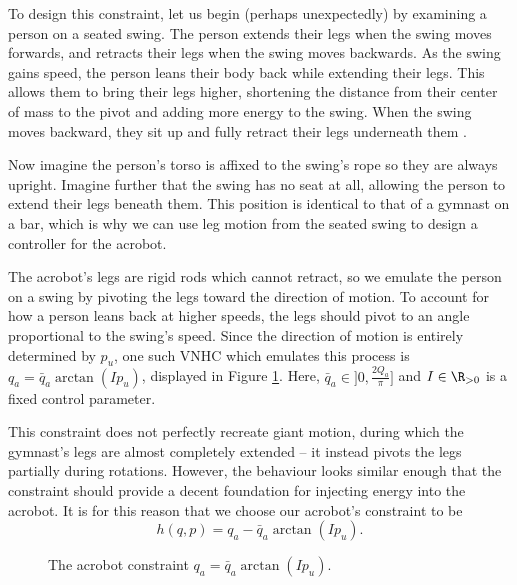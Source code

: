 To design this constraint, let us begin (perhaps unexpectedly) by examining a person on
a seated swing.
The person extends their legs when the swing moves forwards, and retracts their
legs when the swing moves backwards.
As the swing gains speed, the person leans their body back while
extending their legs.
This allows them to bring their legs higher, shortening the distance
from their center of mass to the pivot and adding more energy to the swing.
When the swing moves backward, they sit up and fully retract their legs
underneath them \cite{how_to_pump_a_swing}.

Now imagine the person's torso is affixed to the swing's rope so they are
always upright. 
Imagine further that the swing has no seat at all, allowing the person to extend
their legs beneath them. 
This position is identical to that of a gymnast on a bar, which is why we can
use leg motion from the seated swing to design a controller for the acrobot.

The acrobot's legs are rigid rods which cannot retract, so we emulate the person
on a swing by pivoting the legs toward the direction of motion. 
To account for how a person leans back at higher speeds, the legs should pivot to an
angle proportional to the swing's speed.
Since the direction of motion is entirely determined by \(p_u\), 
one such VNHC which emulates this process is \(q_a = \bar{q}_a\arctan( I p_u)\),
displayed in Figure \ref{fig:qa-arctan}.
Here, \(\bar{q}_a \in ]0,\frac{2 Q_a}{\pi}]\) and \(I \in \R_{>0}\) is a fixed
control parameter.

This constraint does not perfectly recreate giant motion, during which
the gymnast's legs are almost completely extended -- it instead pivots the legs
partially during rotations.
However, the behaviour looks similar enough that the constraint should provide a
decent foundation for injecting energy into the acrobot.
It is for this reason that we choose our acrobot's constraint to be
\begin{equation}\label{eqn:acrobot-constraint}
    h(q,p) = q_a - \bar{q}_a \arctan(I p_u)
    .
\end{equation}

\begin{figure}
    \centering
    
    \caption{The acrobot constraint \(q_a = \bar{q}_a \arctan(I p_u)\).}
    \label{fig:qa-arctan}
\end{figure}

